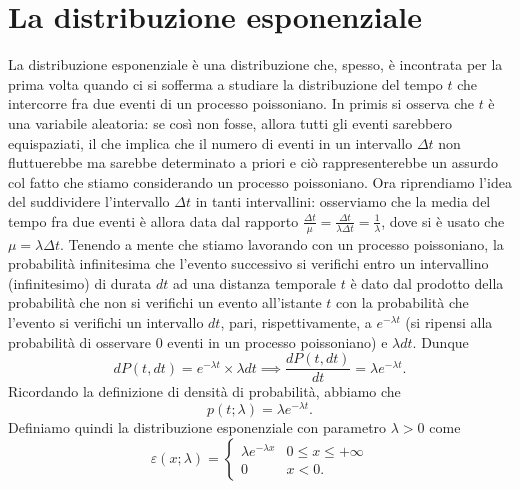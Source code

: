 \documentclass{report}
\begin{document}
\section{La distribuzione esponenziale}
La distribuzione esponenziale è una distribuzione che, spesso, è incontrata per la prima volta quando ci si sofferma a studiare la distribuzione del tempo $t$ che intercorre fra due eventi di un processo poissoniano. In primis si osserva che $t$ è una variabile aleatoria: se così non fosse, allora tutti gli eventi sarebbero equispaziati, il che implica che il numero di eventi in un intervallo $\Delta t$ non fluttuerebbe ma sarebbe determinato a priori e ciò rappresenterebbe un assurdo col fatto che stiamo considerando un processo poissoniano. Ora riprendiamo l'idea del suddividere l'intervallo $\Delta t$ in tanti intervallini: osserviamo che la media del tempo fra due eventi è allora data dal rapporto $\frac{\Delta t}{\mu} = \frac{\Delta t}{\lambda \Delta t} = \frac{1}{\lambda}$, dove si è usato che $\mu = \lambda \Delta t$. Tenendo a mente che stiamo lavorando con un processo poissoniano, la probabilità infinitesima che l'evento successivo si verifichi entro un intervallino (infinitesimo) di durata $dt$ ad una distanza temporale $t$ è dato dal prodotto della probabilità che non si verifichi un evento all'istante $t$ con la probabilità che l'evento si verifichi un intervallo $dt$, pari, rispettivamente, a $e^{-\lambda t}$ (si ripensi alla probabilità di osservare $0$ eventi in un processo poissoniano) e $\lambda dt$. Dunque
$$
	dP(t, dt) = e^{-\lambda t} \times \lambda dt \implies \frac{dP(t, dt)}{dt} = \lambda e^{-\lambda t}.
$$
Ricordando la definizione di densità di probabilità, abbiamo che
$$
	p(t; \lambda) = \lambda e^{- \lambda t}.
$$
Definiamo quindi la distribuzione esponenziale con parametro $\lambda > 0$ come
$$
\varepsilon(x; \lambda) = \begin{cases}
	\lambda e^{-\lambda x} & 0 \leq x \leq +\infty \\
	0 & x < 0.
\end{cases}
$$
\end{document}
